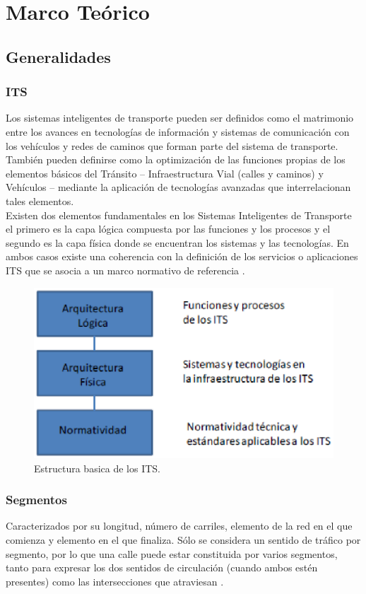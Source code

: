 \chapter{Marco Teórico}
\section{Generalidades}
\subsection{ITS}
Los sistemas inteligentes de transporte pueden ser definidos como el matrimonio entre los avances 
en tecnologías de información y sistemas de comunicación con los vehículos y redes de caminos que 
forman parte del sistema de transporte. También pueden definirse como  la optimización de las 
funciones propias de los elementos básicos del Tránsito – Infraestructura Vial (calles y caminos) 
y Vehículos – mediante la aplicación de tecnologías avanzadas que interrelacionan tales elementos. \\

Existen dos elementos fundamentales en los Sistemas Inteligentes de Transporte  el primero es la 
capa lógica compuesta por las funciones y los procesos y el segundo es la capa física donde se 
encuentran los sistemas y las tecnologías. En ambos casos existe una coherencia con la definición 
de los servicios o aplicaciones ITS que se asocia a un marco normativo de referencia \cite{6}.
\begin{figure}[h]
    \centering
    \includegraphics[width=1\textwidth]{ima/its_phpswxtBw}
    \caption{Estructura basica de los ITS. \cite{5}}
    \label{fig:mesh3}
\end{figure}
\subsection{Segmentos}
Caracterizados por su longitud, número de carriles, elemento de la red en el que comienza y elemento 
en el que finaliza. Sólo se considera un sentido de tráfico por segmento, por lo que una calle puede 
estar constituida por varios segmentos, tanto para expresar los dos sentidos de circulación (cuando 
ambos estén presentes) como las intersecciones que atraviesan \cite{7}.
